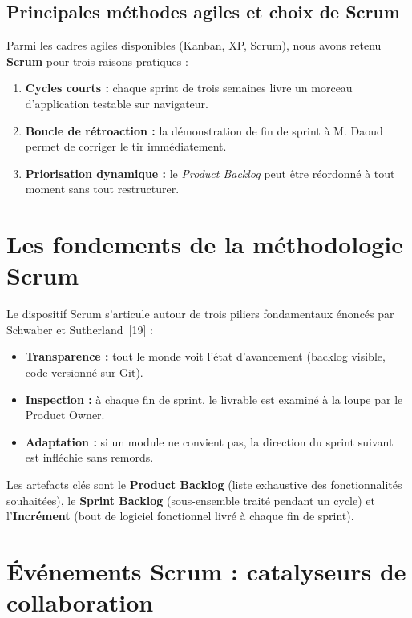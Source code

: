 \subsection{Principales méthodes agiles et choix de Scrum}

Parmi les cadres agiles disponibles (Kanban, XP, Scrum), nous avons retenu \textbf{Scrum} pour trois raisons pratiques :
\begin{enumerate}
    \item \textbf{Cycles courts :} chaque sprint de trois semaines livre un morceau d'application testable sur navigateur.
    \item \textbf{Boucle de rétroaction :} la démonstration de fin de sprint à M. Daoud permet de corriger le tir immédiatement.
    \item \textbf{Priorisation dynamique :} le \textit{Product Backlog} peut être réordonné à tout moment sans tout restructurer.
\end{enumerate}

\section{Les fondements de la méthodologie Scrum}

Le dispositif Scrum s'articule autour de trois piliers fondamentaux énoncés par Schwaber et Sutherland~[19] :

\begin{itemize}
    \item \textbf{Transparence :} tout le monde voit l'état d'avancement (backlog visible, code versionné sur Git).
    \item \textbf{Inspection :} à chaque fin de sprint, le livrable est examiné à la loupe par le Product Owner.
    \item \textbf{Adaptation :} si un module ne convient pas, la direction du sprint suivant est infléchie sans remords.
\end{itemize}

Les artefacts clés sont le \textbf{Product Backlog} (liste exhaustive des fonctionnalités souhaitées), le \textbf{Sprint Backlog} (sous-ensemble traité pendant un cycle) et l'\textbf{Incrément} (bout de logiciel fonctionnel livré à chaque fin de sprint).

\section{Événements Scrum : catalyseurs de collaboration}

